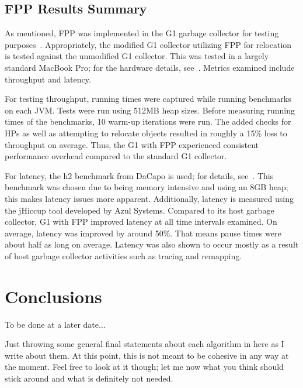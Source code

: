 \documentclass{sig-alternate}
\begin{document}


\subsection{FPP Results Summary}
\label{sec:fppResults}

As mentioned, FPP was implemented in the G1 garbage collector for testing purposes~\cite{Osterlund:FPP}. 
Appropriately, the modified G1 collector utilizing FPP for relocation is tested against the
unmodified G1 collector. This was tested in a largely standard MacBook Pro; for the 
hardware details, see~\cite{Osterlund:FPP}. Metrics
examined include throughput and latency.

For testing throughput, running times were captured while running benchmarks on each
JVM. Tests were run using 512MB heap sizes. Before measuring running times of the 
benchmarks, 10 warm-up iterations were run.
The added checks for HPs as well as attempting to relocate objects resulted
in roughly a 15\% loss to throughput on average. Thus, the G1 with FPP experienced consistent
performance overhead compared to the standard G1 collector.

For latency, the h2 benchmark from DaCapo is used; for details, see~\cite{Blackburn:DaCapo}.
This benchmark was chosen due to being memory intensive and using an 8GB heap;
this makes latency issues more apparent.
Additionally, latency is measured using the jHiccup tool developed by Azul Systems.
Compared to its host garbage collector, G1 with FPP improved latency at all time
intervals examined. On average, latency was improved by around 50\%. That means
pause times were about half as long on average. Latency was also shown to occur
mostly as a result of host garbage collector activities such as tracing and remapping.


\section{Conclusions}
\label{sec:conclusions}

To be done at a later date...

Just throwing some general final statements about each algorithm in here as I write about
them. At this point, this is not meant to be cohesive in any way at the moment. Feel free
to look at it though; let me now what you think should stick around and what is definitely
not needed.
\end{document}
